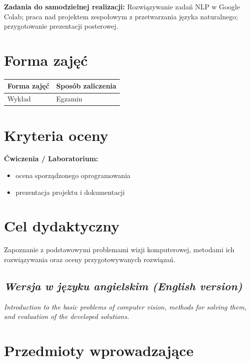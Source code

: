 \documentclass[12pt, a4paper]{article}
\newcommand{\thdrule}{\noalign{\global\setlength{\extrarowheight}{0pt}}}
\newcommand{\thdend}{\noalign{\global\setlength{\extrarowheight}{3pt}}}
\begin{document}
\vspace{4pt}
\noindent\textbf{Zadania do samodzielnej realizacji:} Rozwiązywanie zadań NLP w Google Colab; praca nad projektem zespołowym z przetwarzania języka naturalnego; przygotowanie prezentacji posterowej.

\section{Forma zajęć}

\begin{center}
{\scriptsize
\begin{tabular}{m{5cm}m{8cm}}
\thdrule\toprule
\rowcolor{pjatkRed} {\color{white}\textbf{Forma zajęć}} & {\color{white}\textbf{Sposób zaliczenia}} \\
\midrule\thdend
  \rowcolor{tableRowLight} Wykład & Egzamin \\
\bottomrule
\end{tabular}}
\end{center}

\section{Kryteria oceny}

\textbf{Ćwiczenia / Laboratorium:}
\begin{itemize}
  \item ocena sporządzonego oprogramowania
  \item prezentacja projektu i dokumentacji
\end{itemize}


\section{Cel dydaktyczny}

Zapoznanie z podstawowymi problemami wizji komputerowej, metodami ich rozwiązywania oraz oceny przygotowywanych rozwiązań.

\subsection*{\textit{Wersja w języku angielskim (English version)}}

\textit{Introduction to the basic problems of computer vision, methods for solving them, and evaluation of the developed solutions.}


\section{Przedmioty wprowadzające}
\end{document}
